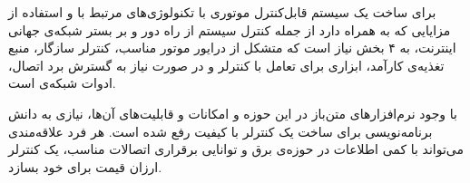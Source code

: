
برای ساخت یک سیستم قابل‌کنترل موتوری با تکنولوژی‌های مرتبط با  و استفاده از مزایایی که به همراه دارد از جمله کنترل سیستم از راه دور و بر بستر شبکه‌ی جهانی اینترنت، به ۴ بخش نیاز است که متشکل از درایور موتور مناسب، کنترلر سازگار، منبع تغذیه‌ی کارآمد، ابزاری برای تعامل با کنترلر و در صورت نیاز به گسترش برد اتصال، ادوات شبکه‌ی  است.

با وجود نرم‌افزارهای متن‌باز در این حوزه و امکانات و قابلیت‌های آن‌ها، نیازی به دانش برنامه‌نویسی برای ساخت یک کنترلر با کیفیت رفع شده است. هر فرد علاقه‌مندی می‌تواند با کمی اطلاعات در حوزه‌ی برق و توانایی برقراری اتصالات مناسب،‌ یک کنترلر ارزان قیمت برای خود بسازد.

